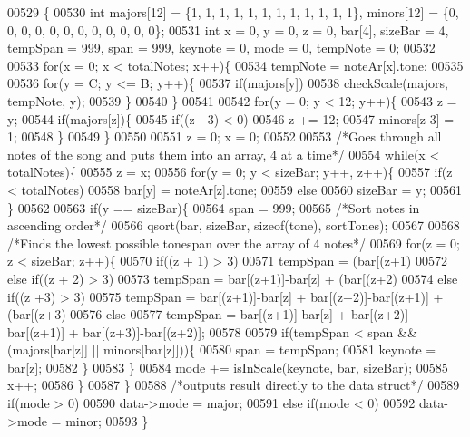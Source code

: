 \begin{DoxyCode}
00529                                                         \{
00530   \textcolor{keywordtype}{int} majors[12] = \{1, 1, 1, 1, 1, 1, 1, 1, 1, 1, 1, 1\}, minors[12] = \{0, 0, 0, 0, 0, 0, 0, 0, 0, 0, 0, 0\};
00531   \textcolor{keywordtype}{int} x = 0, y = 0, z = 0, bar[4], sizeBar = 4, tempSpan = 999, span = 999, keynote = 0, 
      mode = 0, tempNote = 0;
00532 
00533   \textcolor{keywordflow}{for}(x = 0; x < totalNotes; x++)\{
00534     tempNote = noteAr[x].tone;
00535  
00536     \textcolor{keywordflow}{for}(y = C; y <= B; y++)\{
00537       \textcolor{keywordflow}{if}(majors[y])
00538         checkScale(majors, tempNote, y);
00539     \}
00540   \}
00541 
00542   \textcolor{keywordflow}{for}(y = 0; y < 12; y++)\{
00543     z = y;
00544     \textcolor{keywordflow}{if}(majors[z])\{
00545       \textcolor{keywordflow}{if}((z - 3) < 0)
00546         z += 12;
00547     minors[z-3] = 1;
00548     \}
00549   \}
00550 
00551   z = 0;  x = 0;
00552 
00553   \textcolor{comment}{/*Goes through all notes of the song and puts them into an array, 4 at a time*/}
00554   \textcolor{keywordflow}{while}(x < totalNotes)\{
00555     z = x;
00556     \textcolor{keywordflow}{for}(y = 0; y < sizeBar; y++, z++)\{
00557       \textcolor{keywordflow}{if}(z < totalNotes)
00558         bar[y] = noteAr[z].tone;
00559       \textcolor{keywordflow}{else}
00560         sizeBar = y;
00561     \}
00562 
00563     \textcolor{keywordflow}{if}(y == sizeBar)\{
00564       span = 999;
00565       \textcolor{comment}{/*Sort notes in ascending order*/}
00566       qsort(bar, sizeBar, \textcolor{keyword}{sizeof}(tone), sortTones);
00567 
00568       \textcolor{comment}{/*Finds the lowest possible tonespan over the array of 4 notes*/}
00569       \textcolor{keywordflow}{for}(z = 0; z < sizeBar; z++)\{
00570     \textcolor{keywordflow}{if}((z + 1) > 3)
00571           tempSpan = (bar[(z+1)%
00572         \textcolor{keywordflow}{else} \textcolor{keywordflow}{if}((z + 2) > 3)
00573           tempSpan = bar[(z+1)]-bar[z] + (bar[(z+2)%
00574     \textcolor{keywordflow}{else} \textcolor{keywordflow}{if}((z +3) > 3)
00575           tempSpan = bar[(z+1)]-bar[z] + bar[(z+2)]-bar[(z+1)] + (bar[(z+3)%
00576     \textcolor{keywordflow}{else}
00577           tempSpan = bar[(z+1)]-bar[z] + bar[(z+2)]-bar[(z+1)] + bar[(z+3)]-bar[(z+2)];
00578         
00579     \textcolor{keywordflow}{if}(tempSpan < span && (majors[bar[z]] || minors[bar[z]]))\{
00580           span = tempSpan;
00581           keynote = bar[z];
00582         \}
00583       \}
00584       mode += isInScale(keynote, bar, sizeBar);
00585       x++;
00586     \}
00587   \}
00588   \textcolor{comment}{/*outputs result directly to the data struct*/}
00589   \textcolor{keywordflow}{if}(mode > 0)
00590     data->mode = major;
00591   \textcolor{keywordflow}{else} \textcolor{keywordflow}{if}(mode < 0)
00592     data->mode = minor;
00593 \}
\end{DoxyCode}
